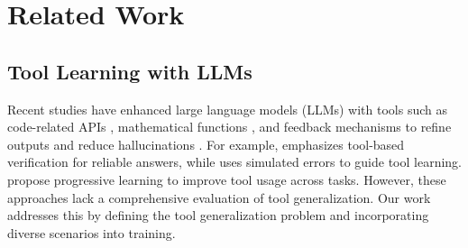 \section{Related Work}
\subsection{Tool Learning with LLMs}  
Recent studies have enhanced large language models (LLMs) with tools such as code-related APIs \cite{patil2023gorilla}, mathematical functions \cite{gou2024critic}, and feedback mechanisms to refine outputs and reduce hallucinations \cite{dhuliawala-etal-2024-chain}. For example, \citet{mekala-etal-2024-toolverifier} emphasizes tool-based verification for reliable answers, while \citet{wang-etal-2024-llms-imaginarium} uses simulated errors to guide tool learning. \citet{Gao_Shi_Zhu_Fang_Xin_Ren_Chen_Ma_Ren_2024} propose progressive learning to improve tool usage across tasks. However, these approaches lack a comprehensive evaluation of tool generalization. Our work addresses this by defining the tool generalization problem and incorporating diverse scenarios into training.  



